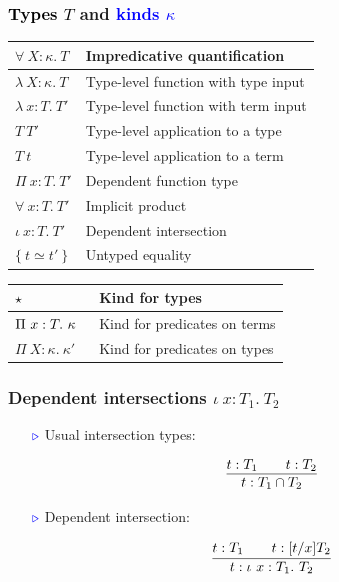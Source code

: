 \documentclass[11pt]{beamer}
\newcommand{\myb}[0]{\ensuremath{\textcolor{blue}{\triangleright}}}
\begin{document}
\begin{frame}
  \frametitle{\textcolor{black}{Types $T$} and \textcolor{blue}{kinds $\kappa$}}
  \begin{tabu}{l|l}

$\forall\ X : \kappa.\ T$ & Impredicative quantification

\\
\hline

$\lambda\ X : \kappa.\ T$ & Type-level function with type input

\\
\hline
    $\lambda\ x : T.\ T'$ & Type-level function with term input \\

\hline
$T\ T'$ & Type-level application to a type \\

\hline
$T\ t$ & Type-level application to a term \\

\hline
$\Pi\ x : T.\ T'$ & Dependent function type \\
\hline
$\forall\ x : T.\ T'$ & Implicit product \\
\hline
$\iota\ x : T.\ T'$ & Dependent intersection \\
\hline
$\{\ t \simeq t'\ \}$ & Untyped equality 
\end{tabu}

\vspace{.2cm}

\color{blue}
\begin{tabu}{l|l}
    $\star$ & Kind for types \\
    \hline
    $\Pi\ x : T.\ \kappa\hspace{.2cm} $ & Kind for predicates on terms \\
    \hline
    $\Pi\ X : \kappa. \ \kappa'$ & Kind for predicates on types
\end{tabu}

\end{frame}

\begin{frame}
  \frametitle{Dependent intersections $\iota\ x:T_1.\ T_2$}

  \begin{itemize}
  \item[$\myb$] Usual intersection types:

    \[
    \infer{t : T_1 \cap T_2}{t : T_1 \qquad t : T_2}
    \]

    \item[$\myb$] Dependent intersection:

    \[
    \infer{t : \iota\ x : T_1 .\ T_2}{t : T_1 \qquad t : [t/x]T_2}
    \]

  \end{itemize}
  
\vspace{.3cm}

  \begin{center}
    \color{purple}
  \end{center}
  \end{frame}
\end{document}
